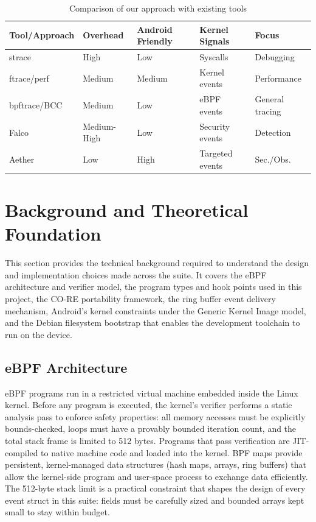 \documentclass{mnitjaipur}
\begin{document}
\begin{table}[H]
  \centering
  \caption{Comparison of our approach with existing tools}
  \begin{tabular}{|p{}|p{}|p{}|p{}|p{}|}
    \hline
    \textbf{Tool/Approach} & \textbf{Overhead} & \textbf{Android Friendly} & \textbf{Kernel Signals} & \textbf{Focus} \\ \hline
    strace & High & Low & Syscalls & Debugging \\ \hline
    ftrace/perf & Medium & Medium & Kernel events & Performance \\ \hline
    bpftrace/BCC & Medium & Low & eBPF events & General tracing \\ \hline
    Falco & Medium-High & Low & Security events & Detection \\ \hline
    Aether & Low & High & Targeted events & Sec./Obs. \\ \hline
  \end{tabular}
\end{table}

\clearpage
\chapter{Background and Theoretical Foundation}
This section provides the technical background required to understand the design and implementation choices made across the suite. It covers the eBPF architecture and verifier model, the program types and hook points used in this project, the CO-RE portability framework, the ring buffer event delivery mechanism, Android's kernel constraints under the Generic Kernel Image model, and the Debian filesystem bootstrap that enables the development toolchain to run on the device.

\section{eBPF Architecture}
eBPF programs run in a restricted virtual machine embedded inside the Linux kernel. Before any program is executed, the kernel's verifier performs a static analysis pass to enforce safety properties: all memory accesses must be explicitly bounds-checked, loops must have a provably bounded iteration count, and the total stack frame is limited to 512 bytes. Programs that pass verification are JIT-compiled to native machine code and loaded into the kernel. BPF maps provide persistent, kernel-managed data structures (hash maps, arrays, ring buffers) that allow the kernel-side program and user-space process to exchange data efficiently.\cite{ebpf_linux_doc} The 512-byte stack limit is a practical constraint that shapes the design of every event struct in this suite: fields must be carefully sized and bounded arrays kept small to stay within budget.
\end{document}
